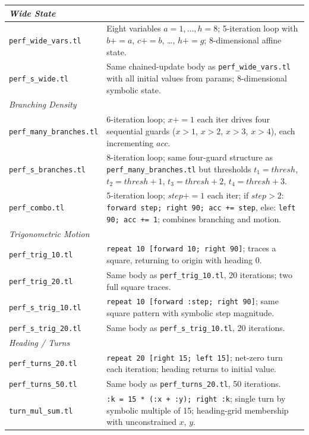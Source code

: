 {\begin{longtable}{p{} p{}}
\midrule
\multicolumn{2}{l}{\textit{Wide State}} \\
\midrule
\texttt{perf\_wide\_vars.tl}     & Eight variables $a{=}1,\ldots,h{=}8$; 5-iteration loop with $b{+}{=}a$, $c{+}{=}b$, \ldots, $h{+}{=}g$; 8-dimensional affine state. \\
\texttt{perf\_s\_wide.tl}        & Same chained-update body as \texttt{perf\_wide\_vars.tl} with all initial values from params; 8-dimensional symbolic state. \\

\midrule
\multicolumn{2}{l}{\textit{Branching Density}} \\
\midrule
\texttt{perf\_many\_branches.tl} & 6-iteration loop; $x{+}{=}1$ each iter drives four sequential guards ($x{>}1$, $x{>}2$, $x{>}3$, $x{>}4$), each incrementing $\mathit{acc}$. \\
\texttt{perf\_s\_branches.tl}    & 8-iteration loop; same four-guard structure as \texttt{perf\_many\_branches.tl} but thresholds $t_1{=}\mathit{thresh}$, $t_2{=}\mathit{thresh}{+}1$, $t_3{=}\mathit{thresh}{+}2$, $t_4{=}\mathit{thresh}{+}3$. \\
\texttt{perf\_combo.tl}          & 5-iteration loop; $\mathit{step}{+}{=}1$ each iter; if $\mathit{step}{>}2$: \texttt{forward step; right 90; acc += step}, else: \texttt{left 90; acc += 1}; combines branching and motion. \\

\midrule
\multicolumn{2}{l}{\textit{Trigonometric Motion}} \\
\midrule
\texttt{perf\_trig\_10.tl}       & \texttt{repeat 10 [forward 10; right 90]}; traces a square, returning to origin with heading 0. \\
\texttt{perf\_trig\_20.tl}       & Same body as \texttt{perf\_trig\_10.tl}, 20 iterations; two full square traces. \\
\texttt{perf\_s\_trig\_10.tl}    & \texttt{repeat 10 [forward :step; right 90]}; same square pattern with symbolic step magnitude. \\
\texttt{perf\_s\_trig\_20.tl}    & Same body as \texttt{perf\_s\_trig\_10.tl}, 20 iterations. \\

\midrule
\multicolumn{2}{l}{\textit{Heading / Turns}} \\
\midrule
\texttt{perf\_turns\_20.tl}      & \texttt{repeat 20 [right 15; left 15]}; net-zero turn each iteration; heading returns to initial value. \\
\texttt{perf\_turns\_50.tl}      & Same body as \texttt{perf\_turns\_20.tl}, 50 iterations. \\
\texttt{turn\_mul\_sum.tl}       & \texttt{:k = 15 * (:x + :y); right :k}; single turn by symbolic multiple of 15; heading-grid membership with unconstrained $x$, $y$. \\

\end{longtable}
}

